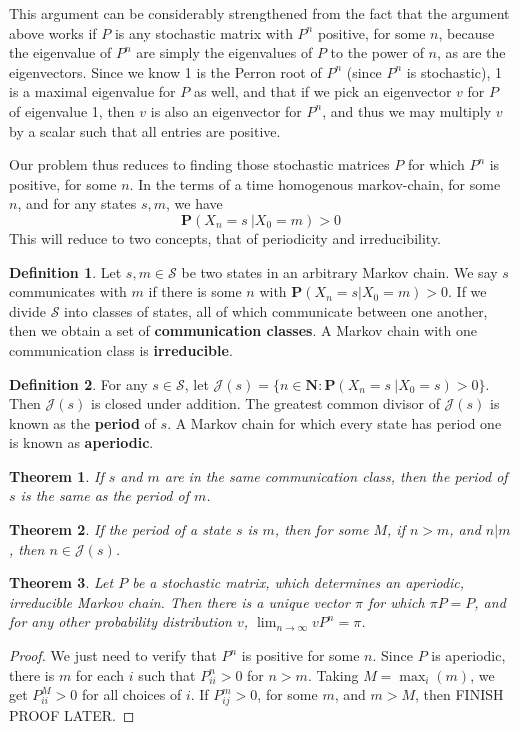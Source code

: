 \documentclass[12pt]{report}
\theoremstyle{plain}
\newtheorem{theorem}{Theorem}[chapter]
\theoremstyle{definition}
\newtheorem*{defi}{Definition}
\newenvironment{definition}
    {\begin{samepage}\begin{framed}\begin{defi}}
    {\end{defi}\end{framed}\end{samepage}}
\begin{document}
This argument can be considerably strengthened from the fact that the argument above works if $P$ is any stochastic matrix with $P^n$ positive, for some $n$, because the eigenvalue of $P^n$ are simply the eigenvalues of $P$ to the power of $n$, as are the eigenvectors. Since we know 1 is the Perron root of $P^n$ (since $P^n$ is stochastic), 1 is a maximal eigenvalue for $P$ as well, and that if we pick an eigenvector $v$ for $P$ of eigenvalue 1, then $v$ is also an eigenvector for $P^n$, and thus we may multiply $v$ by a scalar such that all entries are positive.

Our problem thus reduces to finding those stochastic matrices $P$ for which $P^n$ is positive, for some $n$. In the terms of a time homogenous markov-chain, for some $n$, and for any states $s,m$, we have
%
\[ \mathbf{P}(X_n = s\ | X_0 = m) > 0 \]
%
This will reduce to two concepts, that of periodicity and irreducibility.

\begin{definition}
    Let $s,m \in \mathcal{S}$ be two states in an arbitrary Markov chain. We say $s$ communicates with $m$ if there is some $n$ with $\mathbf{P}(X_n = s | X_0 = m) > 0$. If we divide $\mathcal{S}$ into classes of states, all of which communicate between one another, then we obtain a set of {\bf communication classes}. A Markov chain with one communication class is {\bf irreducible}.
\end{definition}

\begin{definition}
    For any $s \in \mathcal{S}$, let $\mathcal{J}(s) = \{ n \in \mathbf{N} : \mathbf{P}(X_n = s\ | X_0 = s) > 0 \}$. Then $\mathcal{J}(s)$ is closed under addition. The greatest common divisor of $\mathcal{J}(s)$ is known as the {\bf period} of $s$. A Markov chain for which every state has period one is known as {\bf aperiodic}.
\end{definition}

\begin{theorem}
    If $s$ and $m$ are in the same communication class, then the period of $s$ is the same as the period of $m$.
\end{theorem}

\begin{theorem}
    If the period of a state $s$ is $m$, then for some $M$, if $n > m$, and $n | m$, then $n \in \mathcal{J}(s)$.
\end{theorem}

\begin{theorem}
    Let $P$ be a stochastic matrix, which determines an aperiodic, irreducible Markov chain. Then there is a unique vector $\pi$ for which $\pi P = P$, and for any other probability distribution $v$, $\lim_{n \to \infty} vP^n = \pi$.
\end{theorem}
\begin{proof}
    We just need to verify that $P^n$ is positive for some $n$. Since $P$ is aperiodic, there is $m$ for each $i$ such that $P^n_{ii} > 0$ for $n > m$. Taking $M = \max_i(m)$, we get $P^M_{ii} > 0$ for all choices of $i$. If $P^m_{ij} > 0$, for some $m$, and $m > M$, then FINISH PROOF LATER.
\end{proof}
\end{document}
